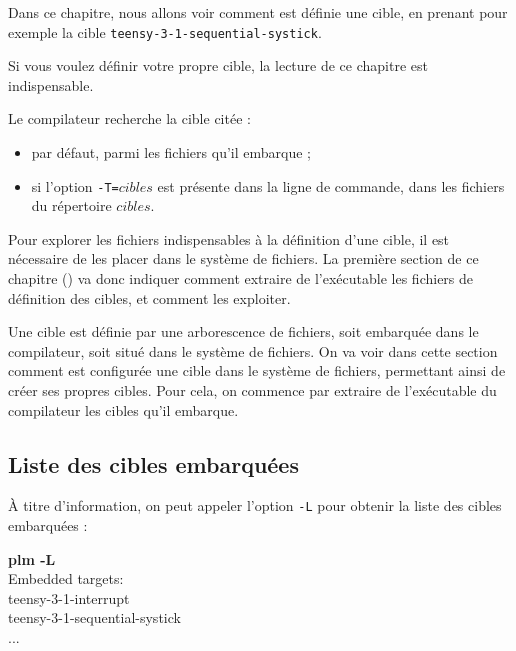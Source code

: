 





Dans ce chapitre, nous allons voir comment est définie une cible, en prenant pour exemple la cible \texttt{teensy-3-1-sequential-systick}. 

Si vous voulez définir votre propre cible, la lecture de ce chapitre est indispensable. 

Le compilateur recherche la cible citée :
\begin{itemize}
  \item par défaut, parmi les fichiers qu'il embarque ;
  \item si l'option \texttt{-T=$cibles$} est présente dans la ligne de commande, dans les fichiers du répertoire $cibles$.
\end{itemize}

Pour explorer les fichiers indispensables à la définition d'une cible, il est nécessaire de les placer dans le système de fichiers. La première section de ce chapitre () va donc indiquer comment extraire de l'exécutable les fichiers de définition des cibles, et comment les exploiter.



Une cible est définie par une arborescence de fichiers, soit embarquée dans le compilateur, soit situé dans le système de fichiers. On va voir dans cette section comment est configurée une cible dans le système de fichiers, permettant ainsi de créer ses propres cibles. Pour cela, on commence par extraire de l'exécutable du compilateur les cibles qu'il embarque.

\subsection{Liste des cibles embarquées}
À titre d'information, on peut appeler l'option \texttt{-L} pour obtenir la liste des cibles embarquées :
\begin{SHELL}
{\bfseries plm -L}\\
Embedded targets:\\ 
\hspace*{1.2em}teensy-3-1-interrupt\\
\hspace*{1.2em}teensy-3-1-sequential-systick\\
\hspace*{1.2em}...
\end{SHELL}

